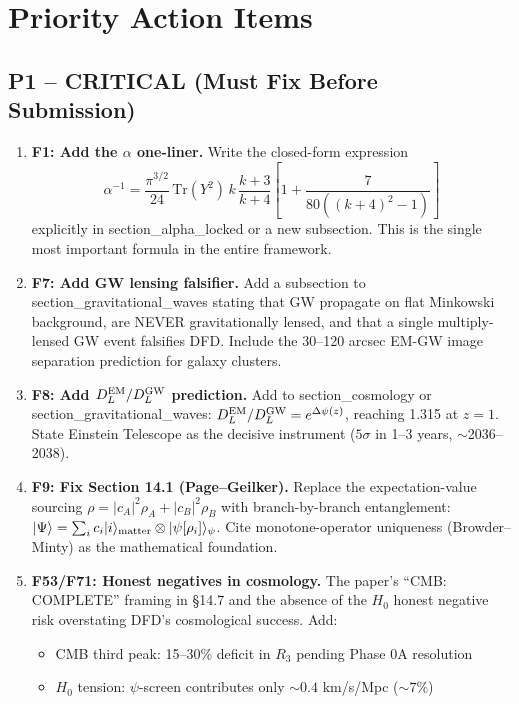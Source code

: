 \documentclass[11pt,a4paper]{article}
\begin{document}
\section{Priority Action Items}

\subsection{P1 -- CRITICAL (Must Fix Before Submission)}

\begin{enumerate}
\item \textbf{F1: Add the $\alpha$ one-liner.} Write the closed-form expression
\begin{equation}
\alpha^{-1} = \frac{\pi^{3/2}}{24}\,\mathrm{Tr}(Y^2)\,k\,\frac{k+3}{k+4}\left[1 + \frac{7}{80((k+4)^2-1)}\right]
\end{equation}
explicitly in section\_alpha\_locked or a new subsection. This is the single most important formula in the entire framework.

\item \textbf{F7: Add GW lensing falsifier.} Add a subsection to section\_gravitational\_waves stating that GW propagate on flat Minkowski background, are NEVER gravitationally lensed, and that a single multiply-lensed GW event falsifies DFD. Include the 30--120 arcsec EM-GW image separation prediction for galaxy clusters.

\item \textbf{F8: Add $D_L^{\rm EM}/D_L^{\rm GW}$ prediction.} Add to section\_cosmology or section\_gravitational\_waves:
$D_L^{\rm EM}/D_L^{\rm GW} = e^{\Delta\psi(z)}$, reaching 1.315 at $z=1$. State Einstein Telescope as the decisive instrument ($5\sigma$ in 1--3 years, $\sim$2036--2038).

\item \textbf{F9: Fix Section 14.1 (Page--Geilker).} Replace the expectation-value sourcing $\rho = |c_A|^2\rho_A + |c_B|^2\rho_B$ with branch-by-branch entanglement:
$|\Psi\rangle = \sum_i c_i |i\rangle_{\rm matter} \otimes |\psi[\rho_i]\rangle_\psi$.
Cite monotone-operator uniqueness (Browder--Minty) as the mathematical foundation.

\item \textbf{F53/F71: Honest negatives in cosmology.} The paper's ``CMB: COMPLETE'' framing in \S14.7 and the absence of the $H_0$ honest negative risk overstating DFD's cosmological success. Add:
  \begin{itemize}
  \item CMB third peak: 15--30\% deficit in $R_3$ pending Phase 0A resolution
  \item $H_0$ tension: $\psi$-screen contributes only $\sim 0.4$ km/s/Mpc ($\sim 7\%$)
  \end{itemize}
\end{enumerate}
\end{document}
